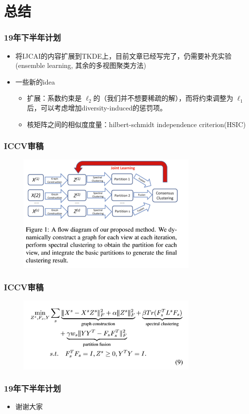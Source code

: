 \section{总结}

\begin{frame}
    \frametitle{19年下半年计划}
    \begin{itemize}
        \item 将IJCAI的内容扩展到TKDE上，目前文章已经写完了，仍需要补充实验(ensemble learning, 其余的多视图聚类方法)
        \item 一些新的idea
            \begin{itemize}
                \item 扩展：系数约束是 $\ell_{2}$的（我们并不想要稀疏的解），而将约束调整为 $\ell_{1}$后，可以考虑增加diversity-induced的惩罚项。
                \item 核矩阵之间的相似度度量：hilbert-schmidt independence criterion(HSIC)
            \end{itemize}

    \end{itemize}
\end{frame}

\begin{frame}
    \frametitle{ICCV审稿} 
    \begin{figure}
        \includegraphics[width=0.8\textwidth]{figures/iccv1.png} 
    \end{figure}          
\end{frame}

\begin{frame}
    \frametitle{ICCV审稿} 
    \begin{figure}
        \includegraphics[width=0.8\textwidth]{figures/iccv2.png} 
    \end{figure}          
\end{frame}

\begin{frame}
    \frametitle{19年下半年计划}
    \begin{itemize}
        \item 谢谢大家
    \end{itemize}
\end{frame}